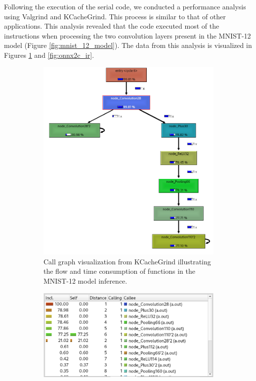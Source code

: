 \documentclass[fleqn,10pt]{olplainarticle}
\begin{document}
Following the execution of the serial code, we conducted a performance analysis using Valgrind and KCacheGrind. This process is similar to that of other applications. This analysis revealed that the code executed most of the instructions when processing the two convolution layers present in the MNIST-12 model (Figure \ref{fig:mnist_12_model}). The data from this analysis is visualized in Figures \ref{fig:onnx2c_tree} and \ref{fig:onnx2c_ir}.

\begin{figure}[!ht]
    \centering
    \begin{subfigure}[b]{0.45\textwidth}
        \centering
        \includegraphics[width=\textwidth]{Images/onnx2c.png}
        \caption{Call graph visualization from KCacheGrind illustrating the flow and time consumption of functions in the MNIST-12 model inference.}
        \label{fig:onnx2c_tree}
    \end{subfigure}
    \hfill
    \begin{subfigure}[b]{0.45\textwidth}
        \centering
        \includegraphics[width=\textwidth]{Images/onnx2c_ir.png}

\end{subfigure}
\end{figure}
\end{document}
